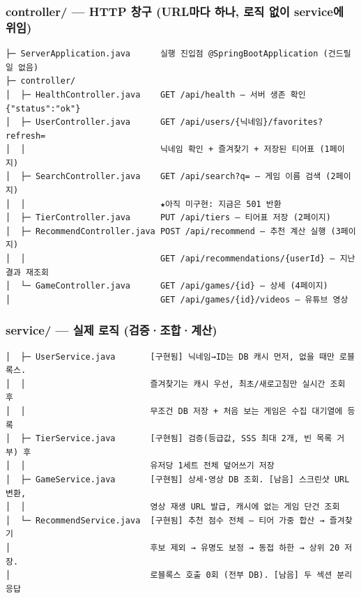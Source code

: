 \documentclass[11pt]{article}
\begin{document}
\subsubsection*{controller/ --- HTTP 창구 (URL마다 하나, 로직 없이 service에 위임)}
\begin{Verbatim}[frame=single, fontsize=\small]
├─ ServerApplication.java      실행 진입점 @SpringBootApplication (건드릴 일 없음)
├─ controller/
│  ├─ HealthController.java    GET /api/health — 서버 생존 확인 {"status":"ok"}
│  ├─ UserController.java      GET /api/users/{닉네임}/favorites?refresh=
│  │                           닉네임 확인 + 즐겨찾기 + 저장된 티어표 (1페이지)
│  ├─ SearchController.java    GET /api/search?q= — 게임 이름 검색 (2페이지)
│  │                           ★아직 미구현: 지금은 501 반환
│  ├─ TierController.java      PUT /api/tiers — 티어표 저장 (2페이지)
│  ├─ RecommendController.java POST /api/recommend — 추천 계산 실행 (3페이지)
│  │                           GET /api/recommendations/{userId} — 지난 결과 재조회
│  └─ GameController.java      GET /api/games/{id} — 상세 (4페이지)
│                              GET /api/games/{id}/videos — 유튜브 영상
\end{Verbatim}

\subsubsection*{service/ --- 실제 로직 (검증·조합·계산)}
\begin{Verbatim}[frame=single, fontsize=\small]
│  ├─ UserService.java       [구현됨] 닉네임→ID는 DB 캐시 먼저, 없을 때만 로블록스.
│  │                         즐겨찾기는 캐시 우선, 최초/새로고침만 실시간 조회 후
│  │                         무조건 DB 저장 + 처음 보는 게임은 수집 대기열에 등록
│  ├─ TierService.java       [구현됨] 검증(등급값, SSS 최대 2개, 빈 목록 거부) 후
│  │                         유저당 1세트 전체 덮어쓰기 저장
│  ├─ GameService.java       [구현됨] 상세·영상 DB 조회. [남음] 스크린샷 URL 변환,
│  │                         영상 재생 URL 발급, 캐시에 없는 게임 단건 조회
│  └─ RecommendService.java  [구현됨] 추천 점수 전체 — 티어 가중 합산 → 즐겨찾기
│                            후보 제외 → 유명도 보정 → 동접 하한 → 상위 20 저장.
│                            로블록스 호출 0회 (전부 DB). [남음] 두 섹션 분리 응답
\end{Verbatim}
\end{document}
